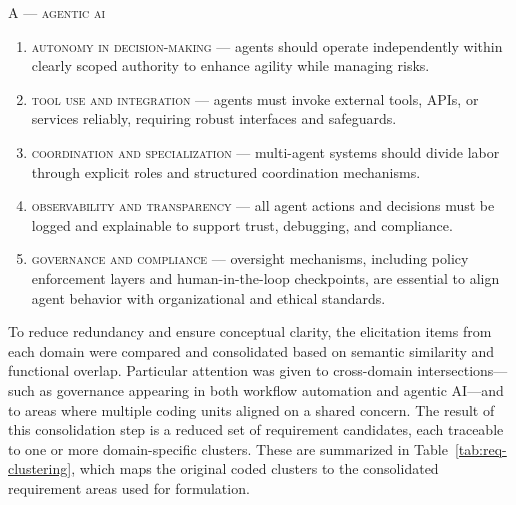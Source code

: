 \noindent\textsc{A --- agentic ai}
\begin{enumerate}
  \item \textsc{autonomy in decision-making} --- agents should operate independently within clearly scoped authority to enhance agility while managing risks.
  \item \textsc{tool use and integration} --- agents must invoke external tools, APIs, or services reliably, requiring robust interfaces and safeguards.
  \item \textsc{coordination and specialization} --- multi-agent systems should divide labor through explicit roles and structured coordination mechanisms.
  \item \textsc{observability and transparency} --- all agent actions and decisions must be logged and explainable to support trust, debugging, and compliance.
  \item \textsc{governance and compliance} --- oversight mechanisms, including policy enforcement layers and human-in-the-loop checkpoints, are essential to align agent behavior with organizational and ethical standards.
\end{enumerate}

To reduce redundancy and ensure conceptual clarity, the elicitation items from each domain were compared and consolidated based on semantic similarity and functional overlap. Particular attention was given to cross-domain intersections—such as governance appearing in both workflow automation and agentic AI—and to areas where multiple coding units aligned on a shared concern. The result of this consolidation step is a reduced set of requirement candidates, each traceable to one or more domain-specific clusters. These are summarized in Table~\ref{tab:req-clustering}, which maps the original coded clusters to the consolidated requirement areas used for formulation.

